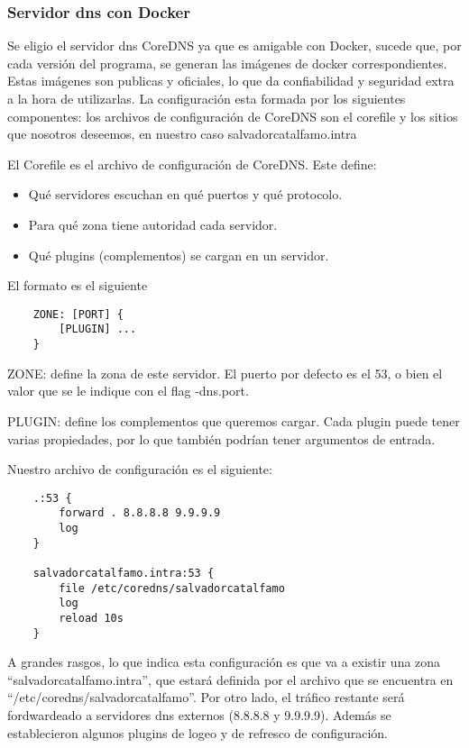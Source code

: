 \subsubsection*{Servidor dns con Docker}

Se eligio el servidor dns CoreDNS ya que es amigable con Docker, sucede que, por cada versión del 
programa, se generan las imágenes de docker correspondientes. Estas imágenes son publicas y oficiales, 
lo que da confiabilidad y seguridad extra a la hora de utilizarlas. La configuración esta formada por 
los siguientes componentes: los archivos de configuración de CoreDNS son el corefile y los sitios que 
nosotros deseemos, en nuestro caso salvadorcatalfamo.intra

El Corefile es el archivo de configuración de CoreDNS. Este define:
\begin{itemize}
    \item Qué servidores escuchan en qué puertos y qué protocolo.
    \item Para qué zona tiene autoridad cada servidor.
    \item Qué plugins (complementos) se cargan en un servidor.
\end{itemize}

\noindent El formato es el siguiente
\begin{verbatim}
    ZONE: [PORT] {
        [PLUGIN] ...
    }
\end{verbatim}

\noindent ZONE: define la zona de este servidor. El puerto por defecto es el 53, o bien el valor que se le indique 
con el flag -dns.port.

\noindent PLUGIN: define los complementos que queremos cargar. Cada plugin puede tener varias propiedades, por 
lo que también podrían tener argumentos de entrada.

\noindent Nuestro archivo de configuración es el siguiente:
\begin{verbatim}
    .:53 {
        forward . 8.8.8.8 9.9.9.9
        log
    }

    salvadorcatalfamo.intra:53 {
        file /etc/coredns/salvadorcatalfamo
        log
        reload 10s
    }    
\end{verbatim}

A grandes rasgos, lo que indica esta configuración es que va a existir una zona 
“salvadorcatalfamo.intra”, que estará definida por el archivo que se encuentra en 
“/etc/coredns/salvadorcatalfamo”. Por otro lado, el tráfico restante será fordwardeado a 
servidores dns externos (8.8.8.8 y 9.9.9.9). Además se establecieron algunos plugins de logeo y 
de refresco de configuración.

